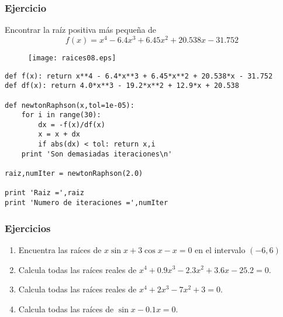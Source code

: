 \begin{frame}
\frametitle{Ejercicio}
Encontrar la raíz positiva más pequeña de
\[ f(x) = x^{4} - 6.4 x^{3} + 6.45x^{2} + 20.538x - 31.752\]
\begin{figure}
	\centering
	 {\texttt{[image: raices08.eps]}}
\end{figure}
\end{frame}
\begin{frame}[fragile]
\begin{lstlisting}
def f(x): return x**4 - 6.4*x**3 + 6.45*x**2 + 20.538*x - 31.752
def df(x): return 4.0*x**3 - 19.2*x**2 + 12.9*x + 20.538

def newtonRaphson(x,tol=1e-05):
    for i in range(30):
        dx = -f(x)/df(x)
        x = x + dx
        if abs(dx) < tol: return x,i
    print 'Son demasiadas iteraciones\n'

raiz,numIter = newtonRaphson(2.0)

print 'Raiz =',raiz
print 'Numero de iteraciones =',numIter
\end{lstlisting}
\end{frame}
\begin{frame}
\frametitle{Ejercicios}
\begin{enumerate}
\item Encuentra las raíces de $x \sin x + 3 \cos x - x = 0$ en el intervalo $(-6,6)$ \\
\item Calcula todas las raíces reales de $x^{4} + 0.9x^{3} - 2.3x^{2} + 3.6x - 25.2 = 0$. \\
\item Calcula todas las raíces reales de $x^{4} + 2x^{3} - 7x^{2} + 3 = 0$. \\
\item Calcula todas las raíces de $\sin x - 0.1x = 0$.
\end{enumerate}
\end{frame}
